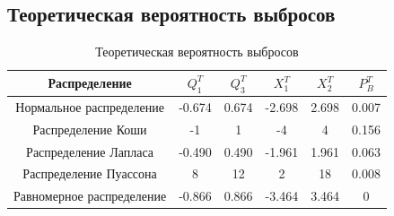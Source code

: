 \subsection{Теоретическая вероятность выбросов}

\begin{table}[H]
	\begin{center}
		\begin{tabular}{|c|c|c|c|c|c|}
			\hline 
			Распределение & $Q_{1}^{T}$ & $Q_{3}^{T}$ & $X_{1}^{T}$ & $X_{2}^{T}$ & $P_{B}^{T}$ \\
			\hline\hline 
			 Нормальное распределение & -0.674 & 0.674  & -2.698  & 2.698 & 0.007\\
			\hline
			 Распределение Коши & -1 & 1 &-4  &4 &0.156\\
			\hline
			 Распределение Лапласа & -0.490 & 0.490 &-1.961  &1.961 &0.063\\
			\hline
			 Распределение Пуассона &8 &12  &2  &18 & 0.008 \\
			\hline
			 Равномерное распределение &-0.866 &0.866  &-3.464  &3.464 &0\\
			\hline
		\end{tabular}
	\end{center}
    \caption{Теоретическая вероятность выбросов}
\end{table}
